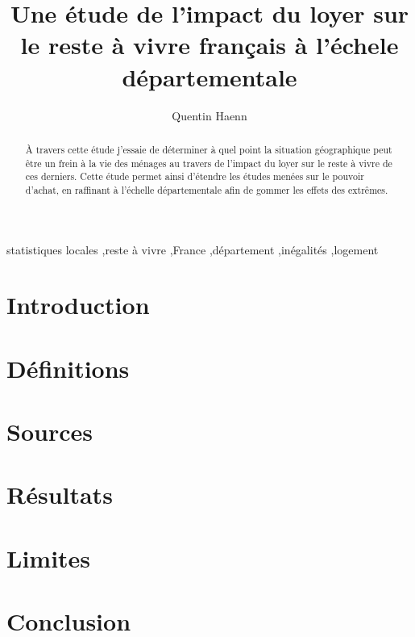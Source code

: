 \documentclass[a4paper, french, 11pt]{elsarticle}
\begin{document}
\begin{frontmatter}

    \title{Une étude de l'impact du loyer sur le reste à vivre français à l'échele départementale}
\author[1]{Quentin Haenn}



\begin{abstract}
    À travers cette étude j'essaie de déterminer à quel point la situation géographique peut être un frein à la vie des ménages au travers de l'impact du loyer sur le reste à vivre de ces derniers. Cette étude permet ainsi d'étendre les études menées sur le pouvoir d'achat, en raffinant à l'échelle départementale afin de gommer les effets des extrêmes.
\end{abstract}

\begin{keyword}
    statistiques locales \sep reste à vivre \sep France \sep département \sep inégalités \sep logement
\end{keyword}

\end{frontmatter}

\section{Introduction}



\section{Définitions}



\section{Sources}



\section{Résultats}



\section{Limites}



\section{Conclusion}


\end{document}
